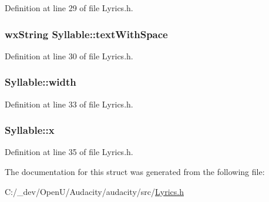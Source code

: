 Definition at line 29 of file Lyrics.\+h.

\subsubsection[{\texorpdfstring{text\+With\+Space}{textWithSpace}}]{\setlength{\rightskip}{0pt plus 5cm}wx\+String Syllable\+::text\+With\+Space}\hypertarget{struct_syllable_a7a39786f83b0ace0db6d80f9ee7c7f61}{}\label{struct_syllable_a7a39786f83b0ace0db6d80f9ee7c7f61}


Definition at line 30 of file Lyrics.\+h.

\subsubsection[{\texorpdfstring{width}{width}}]{ Syllable\+::width}\hypertarget{struct_syllable_a3a15aef28e67d8cebe93baa93d1869ed}{}\label{struct_syllable_a3a15aef28e67d8cebe93baa93d1869ed}


Definition at line 33 of file Lyrics.\+h.

\subsubsection[{\texorpdfstring{x}{x}}]{ Syllable\+::x}\hypertarget{struct_syllable_a2697c1ab411491228ed5ab109f32c653}{}\label{struct_syllable_a2697c1ab411491228ed5ab109f32c653}


Definition at line 35 of file Lyrics.\+h.



The documentation for this struct was generated from the following file\+:\begin{DoxyCompactItemize}
\item 
C\+:/\+\_\+dev/\+Open\+U/\+Audacity/audacity/src/\hyperlink{_lyrics_8h}{Lyrics.\+h}\end{DoxyCompactItemize}
